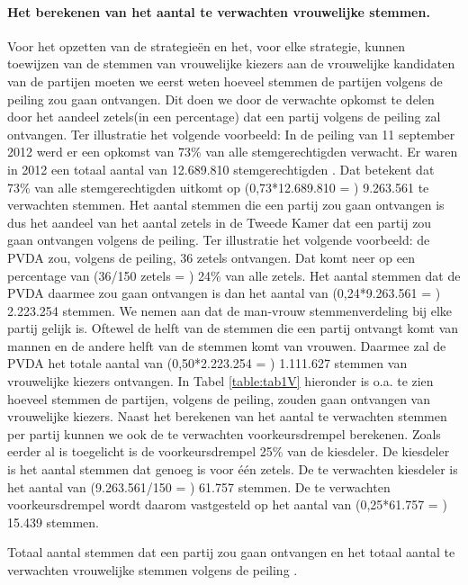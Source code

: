 \paragraph{Het berekenen van het aantal te verwachten vrouwelijke stemmen.}
Voor het opzetten van de strategie\"{e}n en het, voor elke strategie, kunnen toewijzen van de stemmen van vrouwelijke kiezers aan de vrouwelijke kandidaten van de partijen moeten we eerst weten hoeveel stemmen de partijen volgens de peiling zou gaan ontvangen. Dit doen we door de verwachte opkomst te delen door het aandeel zetels(in een percentage) dat een partij volgens de peiling zal ontvangen. Ter illustratie het volgende voorbeeld: In de peiling van 11 september 2012 \citep{IPSOS} werd er een opkomst van 73\% van alle stemgerechtigden verwacht. Er waren in 2012 een totaal aantal van 12.689.810 stemgerechtigden \citep{Kiesraad_uitslag}. Dat betekent dat 73\% van alle stemgerechtigden uitkomt op (0,73*12.689.810 = ) 9.263.561 te verwachten stemmen. Het aantal stemmen die een partij zou gaan ontvangen is dus het aandeel van het aantal zetels in de Tweede Kamer dat een partij zou gaan ontvangen volgens de peiling. Ter illustratie het volgende voorbeeld: de PVDA  zou, volgens de peiling,  36 zetels ontvangen. Dat komt neer op een percentage van (36/150 zetels = ) 24\% van alle zetels. Het aantal stemmen dat de PVDA daarmee zou gaan ontvangen is dan het aantal van (0,24*9.263.561 = ) 2.223.254 stemmen. We nemen aan dat de man-vrouw stemmenverdeling bij elke partij gelijk is. Oftewel de helft van de stemmen die een partij ontvangt komt van mannen en de andere helft van de stemmen komt van vrouwen. Daarmee zal de PVDA het totale aantal van (0,50*2.223.254 = ) 1.111.627 stemmen van vrouwelijke kiezers ontvangen. In Tabel \ref{table:tab1V} hieronder is o.a. te zien hoeveel stemmen de partijen, volgens de peiling, zouden gaan ontvangen van vrouwelijke kiezers. Naast het berekenen van het aantal te verwachten stemmen per partij kunnen we ook de te verwachten voorkeursdrempel berekenen. Zoals eerder al is toegelicht is de voorkeursdrempel 25\% van de kiesdeler. De kiesdeler is het aantal stemmen dat genoeg is voor één zetels. De te verwachten kiesdeler is het aantal van (9.263.561/150 = ) 61.757 stemmen. De te verwachten voorkeursdrempel wordt daarom vastgesteld op het aantal van (0,25*61.757 = ) 15.439 stemmen.






\begin{table}[h]
\centering
	\begin{footnotesize}
		
	\end{footnotesize}
			\caption{Totaal aantal stemmen dat een partij zou gaan ontvangen en het totaal aantal te verwachten vrouwelijke stemmen volgens de peiling \citep{IPSOS}.}
\label{table:tab1V} 
\end{table}

